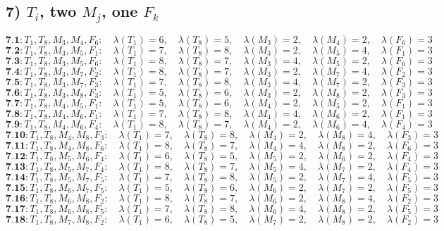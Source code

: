 \documentclass[12p]{article}
\numberwithin{equation}{section}
\begin{document}
\subsection*{7) $T_i$, two $M_j$, one $F_k$}
\[
\textbf{7.1}: T_1, T_8, M_3, M_4, F_6:\quad \lambda(T_1) = 6,\quad \lambda(T_8) = 5,\quad \lambda(M_3) = 2,\quad \lambda(M_4) = 2,\quad \lambda(F_6) = 3
\]
\[
\textbf{7.2}: T_1, T_8, M_3, M_5, F_1:\quad \lambda(T_1) = 7,\quad \lambda(T_8) = 8,\quad \lambda(M_3) = 2,\quad \lambda(M_5) = 4,\quad \lambda(F_1) = 3
\]
\[
\textbf{7.3}: T_1, T_8, M_3, M_5, F_6:\quad \lambda(T_1) = 8,\quad \lambda(T_8) = 7,\quad \lambda(M_3) = 4,\quad \lambda(M_5) = 2,\quad \lambda(F_6) = 3
\]
\[
\textbf{7.4}: T_1, T_8, M_3, M_7, F_2:\quad \lambda(T_1) = 8,\quad \lambda(T_8) = 7,\quad \lambda(M_3) = 2,\quad \lambda(M_7) = 4,\quad \lambda(F_2) = 3
\]
\[
\textbf{7.5}: T_1, T_8, M_3, M_7, F_3:\quad \lambda(T_1) = 7,\quad \lambda(T_8) = 8,\quad \lambda(M_3) = 4,\quad \lambda(M_7) = 2,\quad \lambda(F_3) = 3
\]
\[
\textbf{7.6}: T_1, T_8, M_3, M_8, F_3:\quad \lambda(T_1) = 5,\quad \lambda(T_8) = 6,\quad \lambda(M_3) = 2,\quad \lambda(M_8) = 2,\quad \lambda(F_3) = 3
\]
\[
\textbf{7.7}: T_1, T_8, M_4, M_5, F_1:\quad \lambda(T_1) = 5,\quad \lambda(T_8) = 6,\quad \lambda(M_4) = 2,\quad \lambda(M_5) = 2,\quad \lambda(F_1) = 3
\]
\[
\textbf{7.8}: T_1, T_8, M_4, M_6, F_1:\quad \lambda(T_1) = 7,\quad \lambda(T_8) = 8,\quad \lambda(M_4) = 4,\quad \lambda(M_6) = 2,\quad \lambda(F_1) = 3
\]
\[
\textbf{7.9}: T_1, T_8, M_4, M_6, F_4:\quad \lambda(T_1) = 8,\quad \lambda(T_8) = 7,\quad \lambda(M_4) = 2,\quad \lambda(M_6) = 4,\quad \lambda(F_4) = 3
\]
\[
\textbf{7.10}: T_1, T_8, M_4, M_8, F_3:\quad \lambda(T_1) = 7,\quad \lambda(T_8) = 8,\quad \lambda(M_4) = 2,\quad \lambda(M_8) = 4,\quad \lambda(F_3) = 3
\]
\[
\textbf{7.11}: T_1, T_8, M_4, M_8, F_6:\quad \lambda(T_1) = 8,\quad \lambda(T_8) = 7,\quad \lambda(M_4) = 4,\quad \lambda(M_8) = 2,\quad \lambda(F_6) = 3
\]
\[
\textbf{7.12}: T_1, T_8, M_5, M_6, F_4:\quad \lambda(T_1) = 6,\quad \lambda(T_8) = 5,\quad \lambda(M_5) = 2,\quad \lambda(M_6) = 2,\quad \lambda(F_4) = 3
\]
\[
\textbf{7.13}: T_1, T_8, M_5, M_7, F_4:\quad \lambda(T_1) = 8,\quad \lambda(T_8) = 7,\quad \lambda(M_5) = 4,\quad \lambda(M_7) = 2,\quad \lambda(F_4) = 3
\]
\[
\textbf{7.14}: T_1, T_8, M_5, M_7, F_5:\quad \lambda(T_1) = 7,\quad \lambda(T_8) = 8,\quad \lambda(M_5) = 2,\quad \lambda(M_7) = 4,\quad \lambda(F_5) = 3
\]
\[
\textbf{7.15}: T_1, T_8, M_6, M_7, F_5:\quad \lambda(T_1) = 5,\quad \lambda(T_8) = 6,\quad \lambda(M_6) = 2,\quad \lambda(M_7) = 2,\quad \lambda(F_5) = 3
\]
\[
\textbf{7.16}: T_1, T_8, M_6, M_8, F_2:\quad \lambda(T_1) = 8,\quad \lambda(T_8) = 7,\quad \lambda(M_6) = 2,\quad \lambda(M_8) = 4,\quad \lambda(F_2) = 3
\]
\[
\textbf{7.17}: T_1, T_8, M_6, M_8, F_5:\quad \lambda(T_1) = 7,\quad \lambda(T_8) = 8,\quad \lambda(M_6) = 4,\quad \lambda(M_8) = 2,\quad \lambda(F_5) = 3
\]
\[
\textbf{7.18}: T_1, T_8, M_7, M_8, F_2:\quad \lambda(T_1) = 6,\quad \lambda(T_8) = 5,\quad \lambda(M_7) = 2,\quad \lambda(M_8) = 2,\quad \lambda(F_2) = 3
\]
\end{document}
